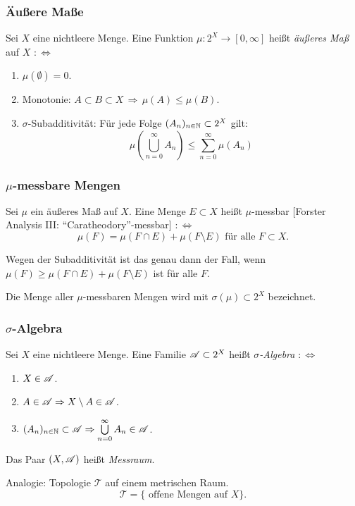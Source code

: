 \documentclass[
 a4paper,
 12pt,
 parskip=half
 ]{scrartcl}
\theoremstyle{plain}
\theoremstyle{definition}
\numberwithin{equation}{section}
\begin{document}
\subsubsection{Äußere Maße}
Sei $X$ eine nichtleere Menge. Eine Funktion $\mu: 2^X \to [0,\infty]$ heißt \emph{äußeres Maß} auf $X$ $:\Leftrightarrow$
\begin{enumerate}
 \item $\mu(\emptyset) = 0$.
 \item Monotonie: $A \subset B \subset X\, \Rightarrow \, \mu(A) \le \mu(B)$.
 \item $\sigma$-Subadditivität: Für jede Folge $(A_n)_{n \in \mathbb{N}} \subset 2^X$ gilt:
  \[ \mu \left( \bigcup_{n=0}^\infty A_n \right) \le \sum_{n=0}^\infty \mu( A_n ) \]
\end{enumerate}

\subsubsection{\texorpdfstring{$\mu$}{Mu}-messbare Mengen}
Sei $\mu$ ein äußeres Maß auf $X$. Eine Menge $E \subset X$ heißt $\mu$-messbar [Forster Analysis III: ``Caratheodory''-messbar] $:\Leftrightarrow$
 \[ \mu(F) = \mu( F \cap E ) + \mu( F \setminus E ) \text{ für alle } F \subset X. \]

\begin{bem}
 Wegen der Subadditivität ist das genau dann der Fall, wenn $\mu(F) \ge \mu(F \cap E) + \mu(F \setminus E)$ ist für alle $F$.
\end{bem}

Die Menge aller $\mu$-messbaren Mengen wird mit $\sigma(\mu) \subset 2^X$ bezeichnet.

\subsubsection{\texorpdfstring{$\sigma$}{Sigma}-Algebra}
Sei $X$ eine nichtleere Menge. Eine Familie $\mathscr{A} \subset 2^X$ heißt \emph{$\sigma$-Algebra} $:\Leftrightarrow$
\begin{enumerate}
 \item $X \in \mathscr{A}$.
 \item $A \in \mathscr{A} \Rightarrow X \setminus A \in \mathscr{A}$.
 \item $(A_n)_{n \in \mathbb{N}} \subset \mathscr{A} \Rightarrow \bigcup\limits_{n=0}^\infty A_n \in \mathscr{A}$.
\end{enumerate}
Das Paar $(X, \mathscr{A})$ heißt \emph{Messraum}. 

Analogie: Topologie $\mathcal{T}$ auf einem metrischen Raum.
\[ \mathcal{T} = \{ \text{ offene Mengen auf } X \}. \]
\end{document}
